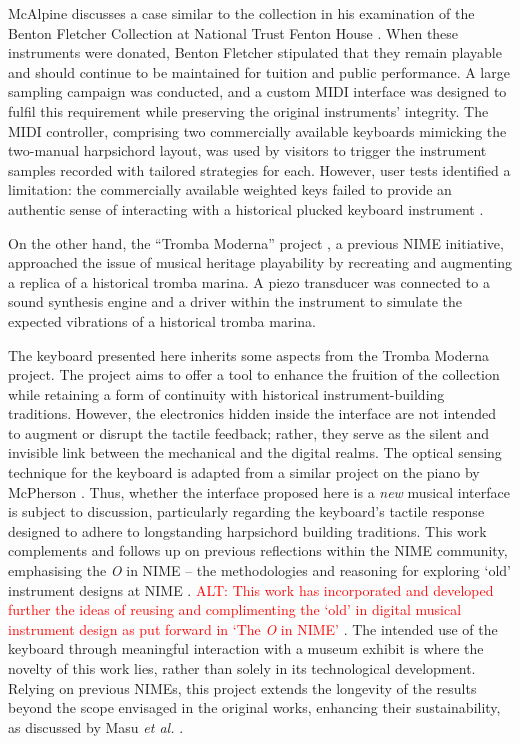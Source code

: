 McAlpine discusses a case similar to the  collection in his examination of the Benton Fletcher Collection at National Trust Fenton House \cite{McAlpine2014}. When these instruments were donated, Benton Fletcher stipulated that they remain playable and should continue to be maintained for tuition and public performance. A large sampling campaign was conducted, and a custom MIDI interface was designed to fulfil this requirement while preserving the original instruments' integrity. The MIDI controller, comprising two commercially available keyboards mimicking the two-manual harpsichord layout, was used by visitors to trigger the instrument samples recorded with tailored strategies for each. However, user tests identified a limitation: the commercially available weighted keys failed to provide an authentic sense of interacting with a historical plucked keyboard instrument \cite{McAlpine2014}. 

On the other hand, the ``Tromba Moderna'' project \cite{Baldwin2016}, a previous NIME initiative, approached the issue of musical heritage playability by recreating and augmenting a replica of a historical tromba marina. A piezo transducer was connected to a sound synthesis engine and a driver within the instrument to simulate the expected vibrations of a historical tromba marina. 


The keyboard presented here inherits some aspects from the Tromba Moderna project. The project aims to offer a tool to enhance the fruition of the  collection while retaining a form of continuity with historical instrument-building traditions. However, the electronics hidden inside the interface are not intended to augment or disrupt the tactile feedback; rather, they serve as the silent and invisible link between the mechanical and the digital realms. 
The optical sensing technique for the keyboard is adapted from a similar project on the piano by McPherson \cite{McPherson2013}. 
Thus, whether the interface proposed here is a \emph{new} musical interface is subject to discussion, particularly regarding the keyboard's tactile response designed to adhere to longstanding harpsichord building traditions. This work complements and follows up on previous reflections within the NIME community, emphasising the \emph{O} in NIME -- the methodologies and reasoning for exploring `old' instrument designs at NIME \cite{Masu_NIME_2023}. 
\textcolor{red}{ALT: This work has incorporated and developed further the ideas of reusing and complimenting the `old' in digital musical instrument design as put forward in `The \emph{O} in NIME' \cite{Masu_NIME_2023}}.
The intended use of the keyboard through meaningful interaction with a museum exhibit is where the novelty of this work lies, rather than solely in its technological development. Relying on previous NIMEs, this project extends the longevity of the results beyond the scope envisaged in the original works, enhancing their sustainability, as discussed by Masu \emph{et al.} \cite{Masu_NIME_2023}.

